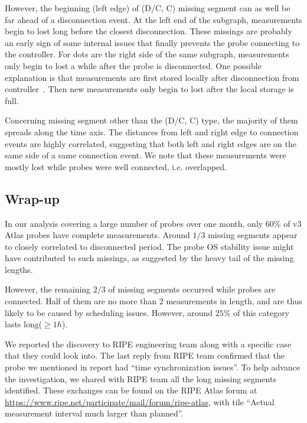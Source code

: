 However, the beginning (left edge) of (D/C, C) missing segment can as well be far ahead of a disconnection event.
At the left end of the subgraph, measurements begin to lost long before the closest disconnection.
These missings are probably an early sign of some internal issues that finally prevents the probe connecting to the controller. 
For dots are the right side of the same subgraph, measurements only begin to lost a while after the probe is disconnected. One possible explanation is that measurements are first stored locally after disconnection from controller~\cite{usb}. Then new measurements only begin to lost after the local storage is full.

Concerning missing segment other than the (D/C, C) type,  the majority of them spreads along the time axis. 
The distances from left and right edge to connection events are highly correlated, suggesting that both left and right edges are on the same side of a same connection event.
We note that these measurements were mostly lost while probes were well connected, i.e. overlapped.

\subsection*{Wrap-up}
In our analysis covering a large number of probes over one month, only 60\% of v3 Atlas probes have complete measurements. Around $1/3$ missing segments appear to closely correlated to disconnected period. The probe OS stability issue might have contributed to such missings, as suggested by the heavy tail of the missing lengths.

However, the remaining $2/3$ of missing segments occurred while probes are connected. 
Half of them are no more than 2 measurements in length, and are thus likely to be caused by scheduling issues. However, around $25\%$ of this category lasts long($\geq 1h$). 

We reported the discovery to RIPE engineering team along with a specific case that they could look into.
The last reply from RIPE team confirmed that the probe we mentioned in report had ``time synchronization issues''. To help advance the investigation, we shared with RIPE team all the long missing segments identified. These exchanges can be found on the RIPE Atlas forum at \url{https://www.ripe.net/participate/mail/forum/ripe-atlas}, with tile ``Actual measurement interval much larger than planned''.

